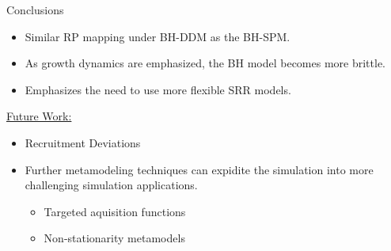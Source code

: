 \documentclass[ xcolor = pdftex, dvipsnames, table ]{beamer}
\begin{document}
%
\begin{frame}{Conclusions}
\begin{itemize}
\setlength\itemsep{1em}
\item Similar RP mapping under BH-DDM as the BH-SPM. 
\item As growth dynamics are emphasized, the BH model becomes more brittle.
\item Emphasizes the need to use more flexible SRR models. 
\end{itemize}
\underline{Future Work:}
\begin{itemize}
	\setlength\itemsep{1em}	
	\item Recruitment Deviations
	\item Further metamodeling techniques can expidite the simulation 
		into more challenging simulation applications.
	\begin{itemize}
		\item Targeted aquisition functions 
		\item Non-stationarity metamodels
	\end{itemize}
\end{itemize}
\end{frame}
\end{document}
